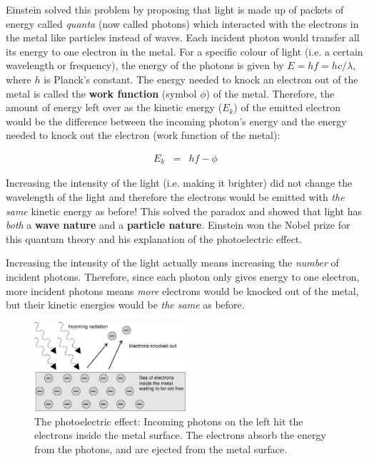 Einstein solved this problem by proposing that light is made up of packets of energy called \textit{quanta} (now called photons) which interacted with the electrons in the metal like particles instead of waves. Each incident photon would transfer all its energy to one electron in the metal. For a specific colour of light (i.e. a certain wavelength or frequency), the energy of the photons is given by $E = hf = hc/\lambda$, where $h$ is Planck's constant. The energy needed to knock an electron out of the metal is called the \textbf{work function} (symbol $\phi$) of the metal. Therefore, the amount of energy left over as the kinetic energy ($E_{k}$) of the emitted electron would be the difference between the incoming photon's energy and the energy needed to knock out the electron (work function of the metal): 

\begin{eqnarray*}
E_{k} &=& hf - \phi 
\end{eqnarray*} 

Increasing the intensity of the light (i.e. making it brighter) did not change the wavelength of the light and therefore the electrons would be emitted with \textit{the same} kinetic energy as before! This solved the paradox and showed that light has \textit{both} a \textbf{wave nature} and a \textbf{particle nature}. Einstein won the Nobel prize for this quantum theory and his explanation of the photoelectric effect. 

Increasing the intensity of the light actually means increasing the \textit{number} of incident photons. Therefore, since each photon only gives energy to one electron, more incident photons means \textit{more} electrons would be knocked out of the metal, but their kinetic energies would be \textit{the same} as before. 

\begin{figure}[!h]
\begin{center}
\includegraphics[width=0.5\textwidth]{../../epsimages/Photoelectric_effect.eps}
\caption{The photoelectric effect: Incoming photons on the left hit the electrons inside the metal surface. The electrons absorb the energy from the photons, and are ejected from the metal surface.}
\label{phot_el}
\end{center}
\end{figure}

